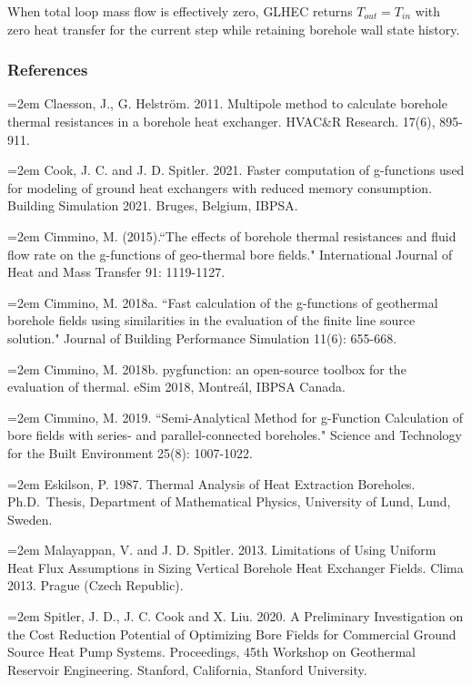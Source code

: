 When total loop mass flow is effectively zero, GLHEC returns \(T_{out}=T_{in}\) with zero heat transfer for the current step while retaining borehole wall state history.

\subsubsection{References}\label{references-2-006}

\hangindent=2em
\noindent Claesson, J., G. Helstr{\"o}m. 2011. Multipole method to calculate borehole thermal resistances in a borehole heat exchanger. HVAC\&R Research. 17(6), 895-911.

\hangindent=2em
\noindent Cook, J. C. and J. D. Spitler. 2021. Faster computation of g-functions used for modeling of ground heat exchangers with reduced memory consumption. Building Simulation 2021. Bruges, Belgium, IBPSA.

\hangindent=2em
\noindent Cimmino, M. (2015).``The effects of borehole thermal resistances and fluid flow rate on the g-functions of geo-thermal bore fields." International Journal of Heat and Mass Transfer 91: 1119-1127.

\hangindent=2em
\noindent Cimmino, M. 2018a. ``Fast calculation of the g-functions of geothermal borehole fields using similarities in the evaluation of the finite line source solution." Journal of Building Performance Simulation 11(6): 655-668.

\hangindent=2em
\noindent Cimmino, M. 2018b. pygfunction: an open-source toolbox for the evaluation of thermal. eSim 2018, Montreál, IBPSA Canada.

\hangindent=2em
\noindent Cimmino, M. 2019. ``Semi-Analytical Method for g-Function Calculation of bore fields with series- and parallel-connected boreholes." Science and Technology for the Built Environment 25(8): 1007-1022.

\hangindent=2em
\noindent Eskilson, P. 1987. Thermal Analysis of Heat Extraction Boreholes. Ph.D.~Thesis, Department of Mathematical Physics, University of Lund, Lund, Sweden.

\hangindent=2em
\noindent Malayappan, V. and J. D. Spitler. 2013. Limitations of Using Uniform Heat Flux Assumptions in Sizing Vertical Borehole Heat Exchanger Fields. Clima 2013. Prague (Czech Republic).

\hangindent=2em
\noindent Spitler, J. D., J. C. Cook and X. Liu. 2020. A Preliminary Investigation on the Cost Reduction Potential of Optimizing Bore Fields for Commercial Ground Source Heat Pump Systems. Proceedings, 45th Workshop on Geothermal Reservoir Engineering. Stanford, California, Stanford University.


